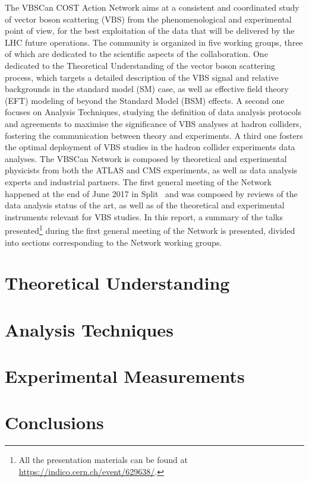 \documentclass{article}
\begin{document}
The VBSCan COST Action Network aims at a consistent and coordinated study of vector boson scattering (VBS)
from the phenomenological and experimental point of view, 
for the best exploitation of the data that will be delivered by the LHC future operations.
The community is organized in five working groups,
three of which are dedicated to the scientific aspects of the collaboration.
One dedicated to the Theoretical Understanding of the vector boson scattering process,
which targets a detailed description of the VBS signal 
and relative backgrounds in the standard model (SM) case, 
as well as effective field theory (EFT) modeling of beyond the Standard Model (BSM) effects.
A second one focuses on Analysis Techniques,
studying the definition of data analysis protocols and agreements 
to maximise the significance of VBS analyses at hadron colliders, 
fostering the communication between theory and experiments.
A third one fosters the optimal deployment of VBS studies 
in the hadron collider experiments data analyses.
\newline{}
The VBSCan Network is composed by theoretical and experimental physicists from both the ATLAS and CMS experiments,
as well as data analysis experts and industrial partners.
The first general meeting of the Network happened at the end of June 2017 in Split~\cite{kickoff}
and was composed by reviews of the data analysis status of the art,
as well as of the theoretical and experimental instruments
relevant for VBS studies.
In this report,
a summary of the talks presented\footnote{All the presentation materials can be found at \url{https://indico.cern.ch/event/629638/}.} during the first general meeting of the Network is presented,
divided into sections corresponding to the Network working groups.

\section{Theoretical Understanding}



\section{Analysis Techniques}



\section{Experimental Measurements}



\section*{Conclusions}

\printbibliography

% 
%  
\end{document}
